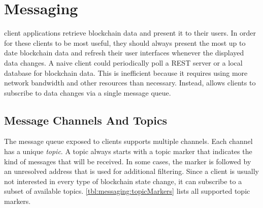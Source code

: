 \section{Messaging}
\label{sec:messaging}

\newcommand{\messagefield}[3]{
	\draw[] (0, #3 + 0.25) node[label=left:\small{#1}]{};
	\draw[draw=black] (0, #3) rectangle (4, #3 + 0.5);
	\draw[] (2, #3 + 0.25) node[label=center:\small{#2}]{};
}

\nemquote{
}{}

 client applications retrieve blockchain data and present it to their users.
In order for these clients to be most useful, they should always present the most up to date blockchain data and refresh their user interfaces whenever the displayed data changes.
A naive client could periodically poll a REST server or a local database for blockchain data.
This is inefficient because it requires using more network bandwidth and other resources than necessary.
Instead, \codenamespace allows clients to subscribe to data changes via a single message queue.

\subsection{Message Channels And Topics}
\label{sec:messaging:channels}

The \codenamespace message queue exposed to clients supports multiple channels.
Each channel has a unique \emph{topic}.
A topic always starts with a topic marker that indicates the kind of messages that will be received.
In some cases, the marker is followed by an unresolved address that is used for additional filtering.
Since a client is usually not interested in every type of blockchain state change, it can subscribe to a subset of available topics.
\autoref{tbl:messaging:topicMarkers} lists all supported topic markers.

\begin{figure}[H]
	\label{tbl:messaging:topicMarkers}
\end{figure}

